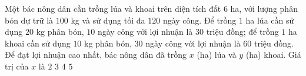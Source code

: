 \begin{ex}%
	Một bác nông dân cần trồng lúa và khoai trên diện tích đất $6$ ha, với lượng phân bón dự trữ là $100$ kg và sử dụng tối đa $120$ ngày công. Để trồng $1$ ha lúa cần sử dụng $20$ kg phân bón, $10$ ngày công với lợi nhuận là $30$ triệu đồng; để trồng $1$ ha khoai cần sử dụng $10$ kg phân bón, $30$ ngày công với lợi nhuận là $60$ triệu đồng. Để đạt lợi nhuận cao nhất, bác nông dân đã trồng $x$ (ha) lúa và $y$ (ha) khoai. Giá trị của $x$ là
	\choice
	{$2$}
	{$3$}
	{\True  $4$}
	{$5$}
\end{ex}

